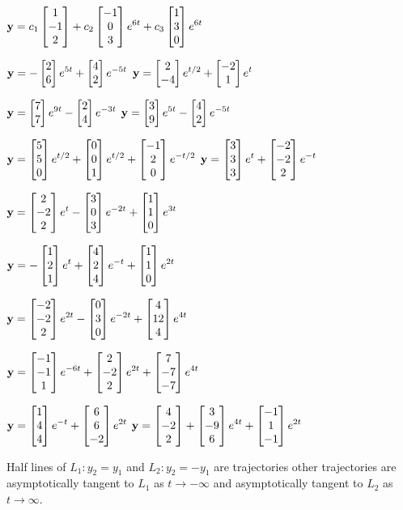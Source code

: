 \smallskip
{}
$\vect{y}=\dst{c_1\begin{bmatrix}1\\-1\\2\end{bmatrix}
+c_2\begin{bmatrix}-1\\0\\3\end{bmatrix}e^{6t}
+c_3\begin{bmatrix}1\\3\\0\end{bmatrix}e^{6t}}$

\smallskip
{}
$\vect{y}=\dst{-\twocol26e^{5t}+\twocol42e^{-5t}}$
$\vect{y}=\dst{\twocol2{-4}e^{t/2}+\twocol{-2}1e^{t}}$

\smallskip

$\vect{y}=\dst{\twocol77e^{9t}-\twocol24e^{-3t}}$
$\vect{y}=\dst{\twocol39e^{5t}-\twocol42e^{-5t}}$

\smallskip

$\vect{y}=\dst{\threecol550e^{t/2}+\threecol001e^{t/2}+
\threecol{-1}20e^{-t/2}}$
\quad {}
$\vect{y}=\dst{\threecol333e^t+\threecol{-2}{-2}2e^{-t}}$

\smallskip

$\vect{y}=\dst{\threecol2{-2}2e^t-\threecol303e^{-2t}+\threecol110e^{3t}}$

\smallskip
{}
$\vect{y}=\dst{-\threecol121e^t+\threecol424e^{-t}+\threecol110e^{2t}}$

\smallskip

 $\vect{y}=\dst{
\threecol{-2}{-2}2e^{2t}-\threecol030e^{-2t}+
\threecol4{12}4e^{4t}}$

\smallskip

 $\vect{y}=\dst{
\threecol{-1}{-1}1e^{-6t}+\threecol2{-2}2e^{2t}+
\threecol7{-7}{-7}e^{4t}}$
\smallskip

 $\vect{y}=\dst{
\threecol144e^{-t}+\threecol66{-2}e^{2t}}$
 $\vect{y}=\dst{
\threecol4{-2}2+\threecol3{-9}6e^{4t}+\threecol{-1}1{-1}e^{2t}}$

\medskip

Half lines of $L_1:y_2=y_1$ and $L_2:y_2=-y_1$ are trajectories
other trajectories are
asymptotically tangent to $L_1$ as $t\to-\infty$ and
asymptotically tangent to $L_2$ as $t\to\infty$.

